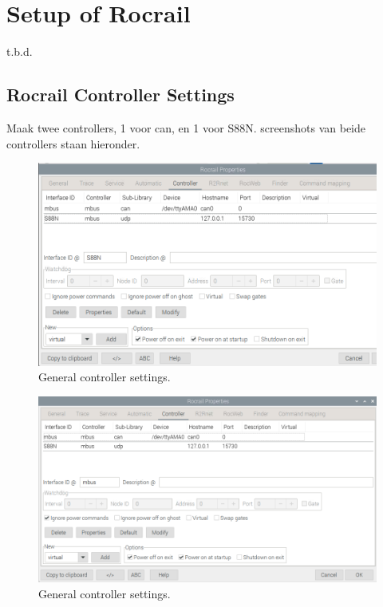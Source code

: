 \section{Setup of Rocrail}
t.b.d.

\subsection{Rocrail Controller Settings}

Maak twee controllers, 1 voor can, en 1 voor S88N. screenshots van beide controllers staan hieronder.

\begin{figure}[h!]
	\centering
	\includegraphics[width=1.00\linewidth]{../figures/rocrailcontrollersettings/rocrail_controller_mbus_S88n.png}
	\caption{General controller settings.}
	\label{rocrail_controller_mbus_S88n}
\end{figure}

\begin{figure}[h!]
	\centering
	\includegraphics[width=1.00\linewidth]{../figures/rocrailcontrollersettings/generalcontrollersettings.png}
	\caption{General controller settings.}
	\label{fig:generalcontrollersettings}
\end{figure}

